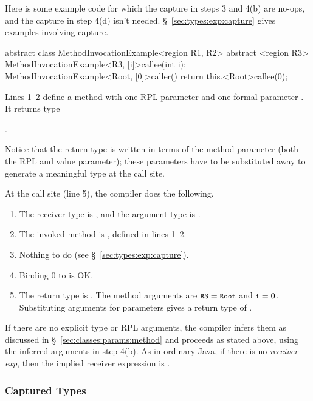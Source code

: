 Here is some example code for which the capture in steps 3 and 4(b)
are no-ops, and the capture in step 4(d) isn't needed.
\S~\ref{sec:types:exp:capture} gives examples involving capture.
%
\begin{numbereddpjlisting}
abstract class MethodInvocationExample<region R1, R2> {
    abstract <region R3>
        MethodInvocationExample<R3, [i]>callee(int i);
    MethodInvocationExample<Root, [0]>caller() {
        return this.<Root>callee(0);
    }
}
\end{numbereddpjlisting}
%
Lines 1--2 define a method  with one RPL parameter
 and one formal parameter .  It returns type
%
\begin{description}
\item {}.  
\end{description}
%
Notice that the return type is written in terms of the method
parameter (both the RPL and value parameter); these parameters have to
be substituted away to generate a meaningful type at the call site.

At the call site (line 5), the compiler does the following.  
%
\begin{enumerate}
%
\item The receiver type is ,
  and the argument type is .
%
\item The invoked method is , defined in lines 1--2.  
%
\item Nothing to do (see \S~\ref{sec:types:exp:capture}).
%
\item Binding 0 to  is OK.  
%
\item The return type is .  The
  method arguments are $\mbox{\small{\texttt{R3}}}=\mbox{\small{\texttt{Root}}}$ and $\mbox{\small{\texttt{i}}}=0$.
  Substituting arguments for parameters gives a return type of
  .
%
\end{enumerate}

 If there are no explicit
type or RPL arguments, the compiler infers them as discussed in
\S~\ref{sec:classes:params:method} and proceeds as stated above, using
the inferred arguments in step 4(b).  As in ordinary Java, if there is
no \emph{receiver-exp}, then the implied receiver expression is
.

\subsubsection{Captured Types%
\label{sec:types:exp:capture}}

